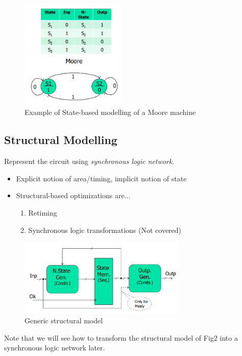 \documentclass{article}
\begin{document}
\begin{figure}[htp]
    \centering
    \includegraphics[width=5cm, scale=1]{S1/stateBasedModelling.PNG}
    \caption{Example of State-based modelling of a Moore machine}
\end{figure}

\subsection{Structural Modelling}
Represent the circuit using \textit{synchronous logic network}.

\begin{itemize}
    \item Explicit notion of area/timing, implicit notion of state
    \item Structural-based optimizations are...
        \begin{enumerate}
            \item Retiming
            \item Synchronous logic transformations (Not covered)
        \end{enumerate}
\end{itemize}

\begin{figure}[htp]
    \centering
    \includegraphics[width=8cm, scale=1]{S1/structuralBasedModelling.PNG}
    \caption{Generic structural model}
\end{figure}

Note that we will see how to transform the structural model of Fig2 into a synchronous logic network later.
\end{document}
